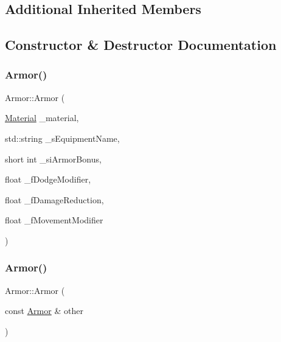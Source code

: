 \subsection*{Additional Inherited Members}


\subsection{Constructor \& Destructor Documentation}
\mbox{\label{class_armor_a4a33d37eb11165792cce7035dfb2ff93}} 
\subsubsection{\texorpdfstring{Armor()}{Armor()}\hspace{0.1cm}{\footnotesize\ttfamily [1/3]}}
{\footnotesize\ttfamily Armor\+::\+Armor (\begin{DoxyParamCaption}\item[{\mbox{\hyperlink{class_material}{Material}}}]{\+\_\+material,  }\item[{std\+::string}]{\+\_\+s\+Equipment\+Name,  }\item[{short int}]{\+\_\+si\+Armor\+Bonus,  }\item[{float}]{\+\_\+f\+Dodge\+Modifier,  }\item[{float}]{\+\_\+f\+Damage\+Reduction,  }\item[{float}]{\+\_\+f\+Movement\+Modifier }\end{DoxyParamCaption})}

\mbox{\label{class_armor_a40d54a621183a93edaecb2cd4e83c800}} 
\subsubsection{\texorpdfstring{Armor()}{Armor()}\hspace{0.1cm}{\footnotesize\ttfamily [2/3]}}
{\footnotesize\ttfamily Armor\+::\+Armor (\begin{DoxyParamCaption}\item[{const \mbox{\hyperlink{class_armor}{Armor}} \&}]{other }\end{DoxyParamCaption})}

\mbox{\label{class_armor_a23323e95bbeb488eb6fe54cbd83d49a2}} 
